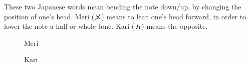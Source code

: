 ﻿These two Japanese words mean bending the note down/up, by changing the position of one’s head.
Meri (メ) means to lean one’s head forward, in order to lower the note a half or whole tone. Kari (ヵ) means the opposite.

\begin{figure}
\centering
\begin{minipage}{0.4\textwidth}
\centering
\caption{Meri} \label{fig:mult2}
\end{minipage}
\hfill
\begin{minipage}{0.4\textwidth}
\centering
\caption{Kari} \label{fig:mult3}
\end{minipage}
\end{figure}


